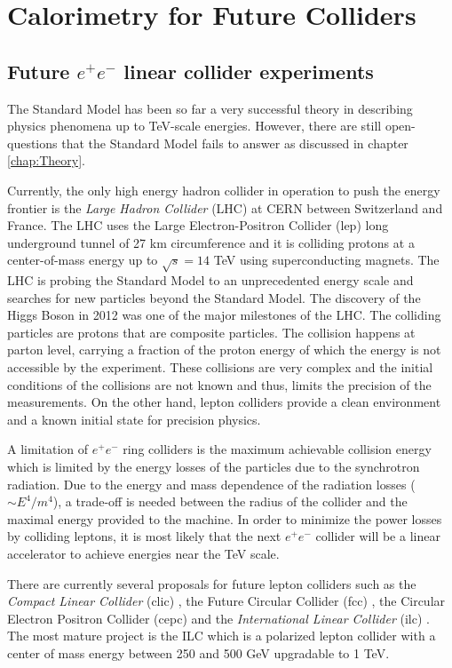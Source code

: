 \part{Calorimetry for Future Colliders}

\chapter{Future $e^+e^-$ linear collider experiments}
\label{chap:FutureColliders}

The Standard Model has been so far a very successful theory in describing physics phenomena up to TeV-scale energies. However, there are still open-questions that the Standard Model fails to answer as discussed in chapter \ref{chap:Theory}.

Currently, the only high energy hadron collider in operation to push the energy frontier is the \textit{Large Hadron Collider} (LHC) at CERN between Switzerland and France. The LHC uses the Large Electron-Positron Collider (\acrshort{lep}) long underground tunnel of 27 km circumference and it is colliding protons at a center-of-mass energy up to $\sqrt{s} = 14$ TeV using superconducting magnets. The LHC is probing the Standard Model to an unprecedented energy scale and searches for new particles beyond the Standard Model. The discovery of the Higgs Boson in 2012 \cite{Aad:2012tfa, Chatrchyan:2012xdj} was one of the major milestones of the LHC. The colliding particles are protons that are composite particles. The collision happens at parton level, carrying a fraction of the proton energy of which the energy is not accessible by the experiment. These collisions are very complex and the initial conditions of the collisions are not known and thus, limits the precision of the measurements. On the other hand, lepton colliders provide a clean environment and a known initial state for precision physics.

A limitation of $e^+e^-$ ring colliders is the maximum achievable collision energy which is limited by the energy losses of the particles due to the synchrotron radiation. Due to the energy and mass dependence of the radiation losses ($\sim E^4/m^4$), a trade-off is needed between the radius of the collider and the maximal energy provided to the machine. In order to minimize the power losses by colliding leptons, it is most likely that the next $e^+e^-$ collider will be a linear accelerator to achieve energies near the TeV scale.

There are currently several proposals for future lepton colliders such as the \textit{Compact Linear Collider} (\acrshort{clic}) \cite{CLIC_CDR}, the Future Circular Collider (\acrshort{fcc}) \cite{Benedikt:2015kqj}, the Circular Electron Positron Collider (\acrshort{cepc}) \cite{CEPC-SPPCStudyGroup:2015csa, CEPC-SPPCStudyGroup:2015esa} and the \textit{International Linear Collider} (\acrshort{ilc}) \cite{ILC_TDR_Vol1}. The most mature project is the ILC which is a polarized lepton collider with a center of mass energy between 250 and 500 GeV upgradable to 1 TeV.

